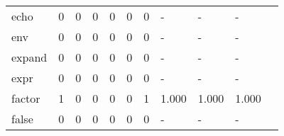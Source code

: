 \begin{longtable}{lp{1.20cm}p{1.20cm}p{1.20cm}p{1.20cm}p{1.20cm}p{1.20cm}p{1.20cm}p{1.20cm}p{1.20cm}p{1.20cm}}
echo      &                                     0 &                                                  0 &                                                  0 &                                                  0 &                                                  0 &                                                  0 &                                             - &                                                  - &                                                  - \\
env       &                                     0 &                                                  0 &                                                  0 &                                                  0 &                                                  0 &                                                  0 &                                             - &                                                  - &                                                  - \\
expand    &                                     0 &                                                  0 &                                                  0 &                                                  0 &                                                  0 &                                                  0 &                                             - &                                                  - &                                                  - \\
expr      &                                     0 &                                                  0 &                                                  0 &                                                  0 &                                                  0 &                                                  0 &                                             - &                                                  - &                                                  - \\
factor    &                                     1 &                                                  0 &                                                  0 &                                                  0 &                                                  0 &                                                  1 &                                         1.000 &                                              1.000 &                                              1.000 \\
false     &                                     0 &                                                  0 &                                                  0 &                                                  0 &                                                  0 &                                                  0 &                                             - &                                                  - &                                                  - \\

\end{longtable}
